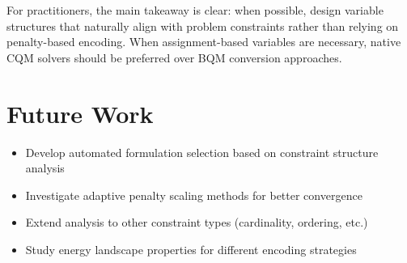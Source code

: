 \documentclass[11pt,a4paper]{article}
\begin{document}
For practitioners, the main takeaway is clear: when possible, design variable structures that naturally align with problem constraints rather than relying on penalty-based encoding. When assignment-based variables are necessary, native CQM solvers should be preferred over BQM conversion approaches.

\section*{Future Work}

\begin{itemize}
    \item Develop automated formulation selection based on constraint structure analysis
    \item Investigate adaptive penalty scaling methods for better convergence
    \item Extend analysis to other constraint types (cardinality, ordering, etc.)
    \item Study energy landscape properties for different encoding strategies
\end{itemize}
\end{document}
